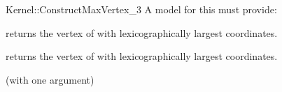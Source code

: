 \begin{ccRefFunctionObjectConcept}{Kernel::ConstructMaxVertex_3}
A model for this must provide:


 {returns the vertex of
   with lexicographically largest coordinates.}

 {returns the vertex of
   with lexicographically largest coordinates.}

\ccRefines
{} (with one argument)

\ccSeeAlso
{}\\

\end{ccRefFunctionObjectConcept}
